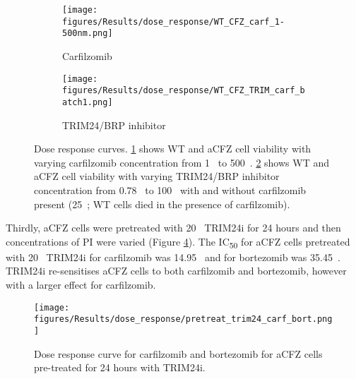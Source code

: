 \begin{figure}[htb]
\begin{subfigure}[t]{0.5\textwidth}
    \texttt{[image: figures/Results/dose\_response/WT\_CFZ\_carf\_1-500nm.png]}
    \caption{Carfilzomib}
    \label{fig:dose_response_wt_cfz_carf}
\end{subfigure}
%
\begin{subfigure}[t]{0.5\textwidth}
    \texttt{[image: figures/Results/dose\_response/WT\_CFZ\_TRIM\_carf\_batch1.png]}
    \caption{TRIM24/BRP inhibitor}
    \label{fig:dose_wt_cfz_trim24}
\end{subfigure}
    \caption[Dose response curves]{Dose response curves. \ref{fig:dose_response_wt_cfz_carf} shows WT and aCFZ cell viability with varying carfilzomib concentration from 1\si{\nano\Molar} to 500\si{\nano\Molar}.
\ref{fig:dose_wt_cfz_trim24} shows WT and aCFZ cell viability with varying TRIM24/BRP inhibitor concentration from 0.78\si{\micro\Molar} to 100\si{\micro\Molar} with and without carfilzomib present (25\si{\nano\Molar}; WT cells died in the presence of carfilzomib).  }
\label{fig:dose_response_carf_trim}
\end{figure}

Thirdly, aCFZ cells were pretreated with 20\si{\micro\Molar} TRIM24i for 24 hours and then concentrations of PI were varied (Figure \ref{fig:dose_response_trim24_pretreat}).
The IC\textsubscript{50} for aCFZ cells pretreated with 20\si{\micro\Molar} TRIM24i for carfilzomib was 14.95\si{\micro\Molar} and for bortezomib was 35.45\si{\micro\Molar}.
TRIM24i re-sensitises aCFZ cells to both carfilzomib and bortezomib, however with a larger effect for carfilzomib. 


\begin{figure}[htb]
\centering
\texttt{[image: figures/Results/dose\_response/pretreat\_trim24\_carf\_bort.png]}
\caption[PI dose response curve: aCFZ pretreated with TRIM24i]{Dose response curve for carfilzomib and bortezomib for aCFZ cells pre-treated for 24 hours with TRIM24i.}
\label{fig:dose_response_trim24_pretreat}
\end{figure}
